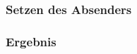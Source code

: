 \documentclass[12pt,ngerman]{beamer}
\begin{document}
\begin{frame}[fragile]
\frametitle{Setzen des Absenders}



\end{frame}

\begin{frame}[plain]
\frametitle{Ergebnis}

\begin{center}
\end{center}
\end{frame}
\end{document}
